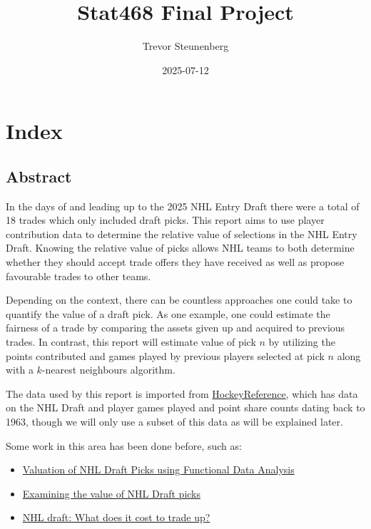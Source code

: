 \documentclass[
  letterpaper,
  DIV=11,
  numbers=noendperiod]{scrreprt}
\title{Stat468 Final Project}
\author{Trevor Steunenberg}
\date{2025-07-12}
\renewcommand*\contentsname{Table of contents}
\newcommand\contentsname{Table of contents}
\begin{document}
\maketitle

\renewcommand*\contentsname{Table of contents}
{
\hypersetup{linkcolor=}
\setcounter{tocdepth}{2}
\tableofcontents
}

\chapter{Index}\label{index}

\section{Abstract}\label{abstract}

In the days of and leading up to the 2025 NHL Entry Draft there were a
total of 18 trades which only included draft picks. This report aims to
use player contribution data to determine the relative value of
selections in the NHL Entry Draft. Knowing the relative value of picks
allows NHL teams to both determine whether they should accept trade
offers they have received as well as propose favourable trades to other
teams.

Depending on the context, there can be countless approaches one could
take to quantify the value of a draft pick. As one example, one could
estimate the fairness of a trade by comparing the assets given up and
acquired to previous trades. In contrast, this report will estimate
value of pick \(n\) by utilizing the points contributed and games played
by previous players selected at pick \(n\) along with a \(k\)-nearest
neighbours algorithm.

The data used by this report is imported from
\href{https://www.hockey-reference.com/draft/}{HockeyReference}, which
has data on the NHL Draft and player games played and point share counts
dating back to 1963, though we will only use a subset of this data as
will be explained later.

Some work in this area has been done before, such as:

\begin{itemize}
\item
  \href{https://summit.sfu.ca/_flysystem/fedora/2023-02/etd22223.pdf}{Valuation
  of NHL Draft Picks using Functional Data Analysis}
\item
  \href{https://soundofhockey.com/2022/06/06/examining-the-value-of-nhl-draft-picks/amp/}{Examining
  the value of NHL Draft picks}
\item
  \href{https://www.broadstreethockey.com/post/nhl-draft-pick-value-trading-up/}{NHL
  draft: What does it cost to trade up?}
\end{itemize}
\end{document}
